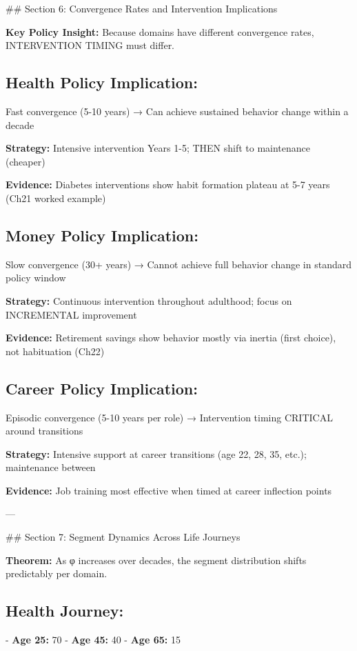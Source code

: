 ## Section 6: Convergence Rates and Intervention Implications

\textbf{Key Policy Insight:} Because domains have different convergence rates, INTERVENTION TIMING must differ.

\subsection{Health Policy Implication:}

Fast convergence (5-10 years) → Can achieve sustained behavior change within a decade

\textbf{Strategy:} Intensive intervention Years 1-5; THEN shift to maintenance (cheaper)

\textbf{Evidence:} Diabetes interventions show habit formation plateau at 5-7 years (Ch21 worked example)

\subsection{Money Policy Implication:}

Slow convergence (30+ years) → Cannot achieve full behavior change in standard policy window

\textbf{Strategy:} Continuous intervention throughout adulthood; focus on INCREMENTAL improvement

\textbf{Evidence:} Retirement savings show behavior mostly via inertia (first choice), not habituation (Ch22)

\subsection{Career Policy Implication:}

Episodic convergence (5-10 years per role) → Intervention timing CRITICAL around transitions

\textbf{Strategy:} Intensive support at career transitions (age 22, 28, 35, etc.); maintenance between

\textbf{Evidence:} Job training most effective when timed at career inflection points

---

## Section 7: Segment Dynamics Across Life Journeys

\textbf{Theorem:} As φ increases over decades, the segment distribution shifts predictably per domain.

\subsection{Health Journey:}
- \textbf{Age 25:} 70%
- \textbf{Age 45:} 40%
- \textbf{Age 65:} 15%

